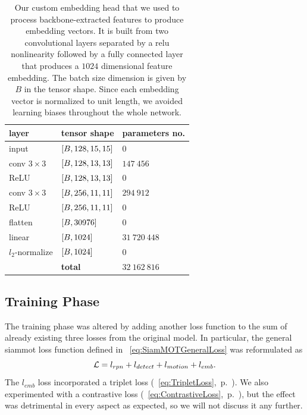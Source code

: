\begin{table}[!t]
    \centering
    \begin{tabular}{lll}
        \toprule
        \textbf{layer}    & \textbf{tensor shape}        & \textbf{parameters no.} \\
        \midrule
        input             & $\left[ {B, 128, 15, 15} \right]$ & $0$                     \\
        \midrule
        conv $3 \times 3$ & $\left[ {B, 128, 13, 13} \right]$ & $147\ 456$              \\
        ReLU              & $\left[ {B, 128, 13, 13} \right]$ & $0$                     \\
        \midrule
        conv $3 \times 3$ & $\left[ {B, 256, 11, 11} \right]$ & $294\ 912$              \\
        ReLU              & $\left[ {B, 256, 11, 11} \right]$ & $0$                     \\
        \midrule
        flatten           & $\left[ {B, 30976} \right]$       & $0$                     \\
        linear            & $\left[ {B, 1024} \right]$        & $31\ 720\ 448$          \\
        \midrule
        $l_2$-normalize   & $\left[ {B, 1024} \right]$        & $0$                     \\
        \bottomrule
                          & \textbf{total}               & $32\ 162\ 816$          \\
        \cline{2-3}
    \end{tabular}
    \caption[Feature embedding head]{Our custom embedding head that we used to process backbone-extracted features to produce embedding vectors. It is built from two convolutional layers separated by a \gls{relu} nonlinearity followed by a fully connected layer that produces a $1024$ dimensional feature embedding. The batch size dimension is given by $B$ in the tensor shape. Since each embedding vector is normalized to unit length, we avoided learning biases throughout the whole network.}
    \label{tab:FeatureEmbeddingHead}
\end{table}

\subsection{Training Phase}

The training phase was altered by adding another loss function to the sum of already existing three losses from the original model. In particular, the general \gls{siammot} loss function defined in \eqtext{}~\ref{eq:SiamMOTGeneralLoss} was reformulated as
\begin{equation}
    \label{eq:SiamMOTFeatureEmbLoss}
    \mathcal{L} = l_{rpn} + l_{detect} + l_{motion} + l_{emb}.
\end{equation}
The $l_{emb}$ loss incorporated a triplet loss (\eqtext{}~\ref{eq:TripletLoss},~p.~\pageref{eq:TripletLoss}). We also experimented with a contrastive loss (\eqtext{}~\ref{eq:ContrastiveLoss},~p.~\pageref{eq:ContrastiveLoss}), but the effect was detrimental in every aspect as expected, so we will not discuss it any further.

